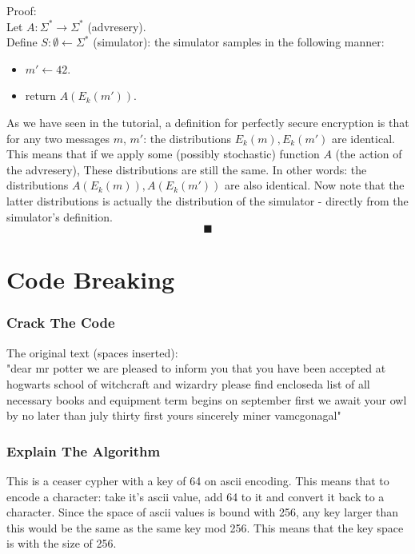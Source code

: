\documentclass{article}
\begin{document}
Proof:\\
Let $A:\Sigma^*\longrightarrow\Sigma^*$ (advresery).\\
Define $S:\emptyset\longleftarrow\Sigma^*$ (simulator): the simulator samples in the following manner:
\begin{itemize}
	\item $m'\longleftarrow42$.
	\item return $A(E_k(m'))$.
\end{itemize}
As we have seen in the tutorial, a definition for perfectly secure encryption 
is that for any two messages $m$, $m'$: the distributions $E_k(m), E_k(m')$ are identical.
This means that if we apply some (possibly stochastic) function $A$ (the action of the advresery),
These distributions are still the same. In other words: the distributions $A(E_k(m)), A(E_k(m'))$ are also
identical. Now note that the latter distributions is actually the distribution of the simulator - directly 
from the simulator's definition.
\[\blacksquare\]


\part*{Code Breaking}
\setcounter{section}{0}
\section{Crack The Code}
The original text (spaces inserted):\\
"dear mr potter we are pleased to inform you that you have been accepted at hogwarts school
of witchcraft and wizardry please find encloseda list of all necessary books 
and equipment term begins on september first we await your owl by no later 
than july thirty first yours sincerely miner vamcgonagal"

\section{Explain The Algorithm}
This is a ceaser cypher with a key of 64 on ascii encoding.
This means that to encode a character: take it's ascii value, add 64 to it
and convert it back to a character.
Since the space of ascii values is bound with 256, any key larger than this would be
the same as the same key mod 256. This means that the key space is with the size of 256.
\end{document}
